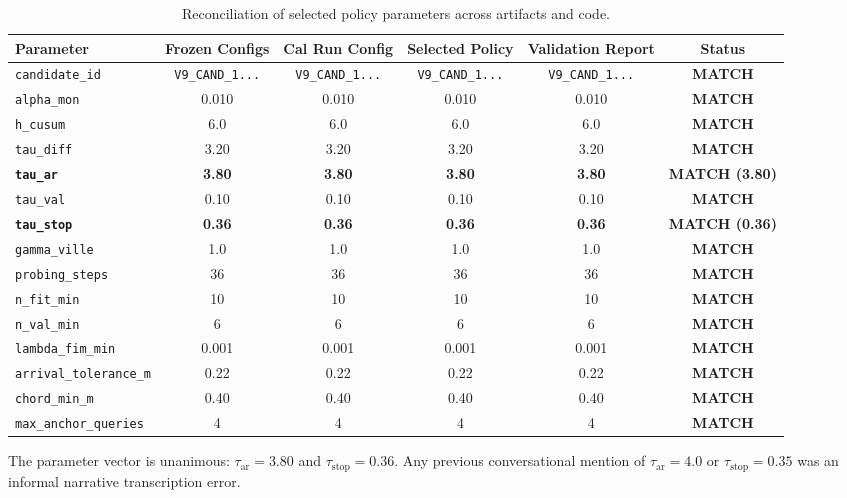 \documentclass[10pt,a4paper]{article}
\begin{document}
\begin{table}[htbp]
\centering
\small
\begin{tabularx}{\textwidth}{lccccc}
\toprule
\textbf{Parameter} & \textbf{Frozen Configs} & \textbf{Cal Run Config} & \textbf{Selected Policy} & \textbf{Validation Report} & \textbf{Status} \\
\midrule
\texttt{candidate\_id} & \texttt{V9\_CAND\_1...} & \texttt{V9\_CAND\_1...} & \texttt{V9\_CAND\_1...} & \texttt{V9\_CAND\_1...} & \textbf{MATCH} \\
\texttt{alpha\_mon} & 0.010 & 0.010 & 0.010 & 0.010 & \textbf{MATCH} \\
\texttt{h\_cusum} & 6.0 & 6.0 & 6.0 & 6.0 & \textbf{MATCH} \\
\texttt{tau\_diff} & 3.20 & 3.20 & 3.20 & 3.20 & \textbf{MATCH} \\
\textbf{\texttt{tau\_ar}} & \textbf{3.80} & \textbf{3.80} & \textbf{3.80} & \textbf{3.80} & \textbf{MATCH (3.80)} \\
\texttt{tau\_val} & 0.10 & 0.10 & 0.10 & 0.10 & \textbf{MATCH} \\
\textbf{\texttt{tau\_stop}} & \textbf{0.36} & \textbf{0.36} & \textbf{0.36} & \textbf{0.36} & \textbf{MATCH (0.36)} \\
\texttt{gamma\_ville} & 1.0 & 1.0 & 1.0 & 1.0 & \textbf{MATCH} \\
\texttt{probing\_steps} & 36 & 36 & 36 & 36 & \textbf{MATCH} \\
\texttt{n\_fit\_min} & 10 & 10 & 10 & 10 & \textbf{MATCH} \\
\texttt{n\_val\_min} & 6 & 6 & 6 & 6 & \textbf{MATCH} \\
\texttt{lambda\_fim\_min} & 0.001 & 0.001 & 0.001 & 0.001 & \textbf{MATCH} \\
\texttt{arrival\_tolerance\_m} & 0.22 & 0.22 & 0.22 & 0.22 & \textbf{MATCH} \\
\texttt{chord\_min\_m} & 0.40 & 0.40 & 0.40 & 0.40 & \textbf{MATCH} \\
\texttt{max\_anchor\_queries} & 4 & 4 & 4 & 4 & \textbf{MATCH} \\
\bottomrule
\end{tabularx}
\caption{Reconciliation of selected policy parameters across artifacts and code.}
\label{tab:param_reconcile}
\end{table}

The parameter vector is unanimous: $\tau_{\text{ar}} = 3.80$ and $\tau_{\text{stop}} = 0.36$. Any previous conversational mention of $\tau_{\text{ar}} = 4.0$ or $\tau_{\text{stop}} = 0.35$ was an informal narrative transcription error.
\end{document}
